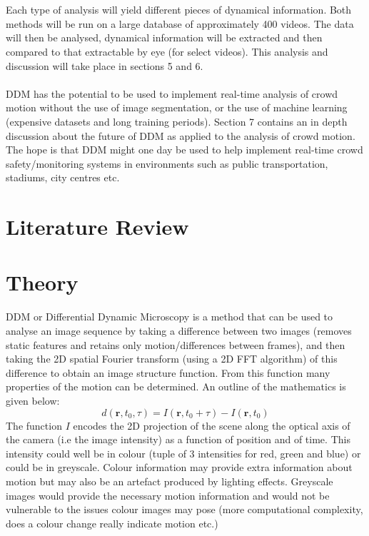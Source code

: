 \documentclass[11pt]{article}
\begin{document}
\\\\
Each type of analysis will yield different pieces of dynamical information. Both methods will be run on a large database of approximately 400 videos\cite{crowdMotionDB}. The data will then be analysed, dynamical information will be extracted and then compared to that extractable by eye (for select videos). This analysis and discussion will take place in sections 5 and 6.
\\\\
DDM has the potential to be used to implement real-time analysis of crowd motion without the use of image segmentation, or the use of machine learning (expensive datasets and long training periods). Section 7 contains an in depth discussion about the future of DDM as applied to the analysis of crowd motion. The hope is that DDM might one day be used to help implement real-time crowd safety/monitoring systems in environments such as public transportation, stadiums, city centres etc.

\clearpage
\section{Literature Review}

\clearpage
\section{Theory}

DDM or Differential Dynamic Microscopy is a method that can be used to analyse an image sequence by taking a difference between two images (removes static features and retains only motion/differences between frames), and then taking the 2D spatial Fourier transform (using a 2D FFT algorithm\cite{fft}) of this difference to obtain an image structure function.
From this function many properties of the motion can be determined.\cite{ddm1}
An outline of the mathematics is given below:
\\
\begin{equation}
    d(\textbf{r}, t_0, \tau) = I(\mathbf{r}, t_0 + \tau) - I(\mathbf{r}, t_0)
\end{equation}
The function $\textit{I}$ encodes the 2D projection of the scene along the optical axis of the camera (i.e the image intensity) as a function of position and of time.
This intensity could well be in colour (tuple of 3 intensities for red, green and blue) or could be in greyscale. Colour information may provide extra information about motion but may also be an artefact produced by lighting effects. Greyscale images would provide the necessary motion information and would not be vulnerable to the issues colour images may pose (more computational complexity, does a colour change really indicate motion etc.)
\end{document}
